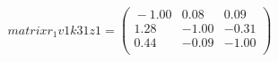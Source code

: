 \documentclass[10pt,a4paper]{article}
\begin{document}
 \begin{equation*} matrixr_1v1k31z1  =  %
\begin{pmatrix}{}
  -1.00 & 0.08 & 0.09 \\ 
  1.28 & -1.00 & -0.31 \\ 
  0.44 & -0.09 & -1.00 \\ 
  \end{pmatrix}
 \end{equation*} 
\end{document}
